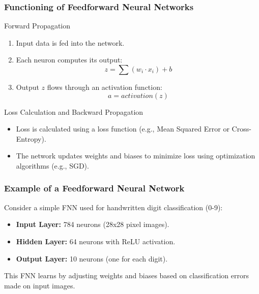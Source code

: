 \documentclass[aspectratio=169]{beamer}
\begin{document}
\begin{frame}[fragile]
    \frametitle{Functioning of Feedforward Neural Networks}
    \begin{block}{Forward Propagation}
        \begin{enumerate}
            \item Input data is fed into the network.
            \item Each neuron computes its output:
            \begin{equation}
                z = \sum (w_i \cdot x_i) + b
            \end{equation}
            \item Output \(z\) flows through an activation function:
            \begin{equation}
                a = activation(z)
            \end{equation}
        \end{enumerate}
    \end{block}
    
    \begin{block}{Loss Calculation and Backward Propagation}
        \begin{itemize}
            \item Loss is calculated using a loss function (e.g., Mean Squared Error or Cross-Entropy).
            \item The network updates weights and biases to minimize loss using optimization algorithms (e.g., SGD).
        \end{itemize}
    \end{block}
\end{frame}

\begin{frame}[fragile]
    \frametitle{Example of a Feedforward Neural Network}
    Consider a simple FNN used for handwritten digit classification (0-9):
    \begin{itemize}
        \item \textbf{Input Layer:} 784 neurons (28x28 pixel images).
        \item \textbf{Hidden Layer:} 64 neurons with ReLU activation.
        \item \textbf{Output Layer:} 10 neurons (one for each digit).
    \end{itemize}
    This FNN learns by adjusting weights and biases based on classification errors made on input images.
\end{frame}
\end{document}
